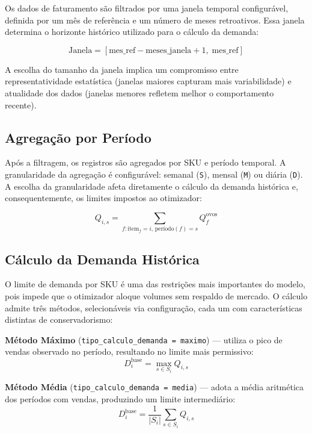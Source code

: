 \documentclass[11pt,a4paper]{article}
\begin{document}
Os dados de faturamento são filtrados por uma janela temporal configurável, definida
por um mês de referência e um número de meses retroativos. Essa janela determina o
horizonte histórico utilizado para o cálculo da demanda:

\begin{equation}\label{eq:auto:009}
\text{Janela} = [\text{mes\_ref} - \text{meses\_janela} + 1, \; \text{mes\_ref}]
\end{equation}

A escolha do tamanho da janela implica um compromisso entre representatividade
estatística (janelas maiores capturam mais variabilidade) e atualidade dos
dados (janelas menores refletem melhor o comportamento recente).

\subsection{Agregação por Período}

Após a filtragem, os registros são agregados por SKU e período temporal. A
granularidade da agregação é configurável: semanal (\texttt{S}), mensal
(\texttt{M}) ou diária (\texttt{D}). A escolha da granularidade afeta
diretamente o cálculo da demanda histórica e, consequentemente, os limites
impostos ao otimizador:

\begin{equation}\label{eq:auto:010}
Q_{i,s} = \sum_{f : \text{item}_f = i, \, \text{período}(f) = s} Q_f^{\text{ovos}}
\end{equation}

\subsection{Cálculo da Demanda Histórica}

O limite de demanda por SKU é uma das restrições mais importantes do modelo,
pois impede que o otimizador aloque volumes sem respaldo de mercado. O cálculo
admite três métodos, selecionáveis via configuração, cada um com características
distintas de conservadorismo:

\textbf{Método Máximo} (\texttt{tipo\_calculo\_demanda = maximo}) --- utiliza o
pico de vendas observado no período, resultando no limite mais permissivo:
\begin{equation}\label{eq:auto:011}
D_i^{\text{base}} = \max_{s \in S_i} Q_{i,s}
\end{equation}

\textbf{Método Média} (\texttt{tipo\_calculo\_demanda = media}) --- adota a
média aritmética dos períodos com vendas, produzindo um limite intermediário:
\begin{equation}\label{eq:auto:012}
D_i^{\text{base}} = \frac{1}{|S_i|} \sum_{s \in S_i} Q_{i,s}
\end{equation}
\end{document}
